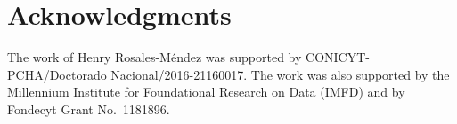 \documentclass[sigconf]{acmart}
\begin{document}

\section{Acknowledgments}

The work of Henry Rosales-M\'endez was supported by CONICYT-PCHA/Doctorado Nacional/2016-21160017. The work was also supported by the Millennium Institute for Foundational Research on Data (IMFD) and by Fondecyt Grant No.\ 1181896.

%


\end{document}
